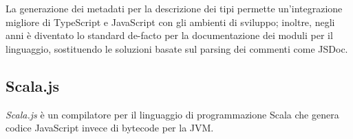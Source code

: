 


      La generazione dei metadati per la descrizione dei tipi permette un'integrazione migliore di TypeScript e JavaScript con gli ambienti di sviluppo;
      inoltre, negli anni è diventato lo standard de-facto per la documentazione dei moduli per il linguaggio, sostituendo le soluzioni basate sul parsing dei commenti come JSDoc.

    \subsection{Scala.js}\label{subsec:scalajs}
      \emph{Scala.js} è un compilatore per il linguaggio di programmazione Scala che genera codice JavaScript invece di bytecode per la JVM\@.


